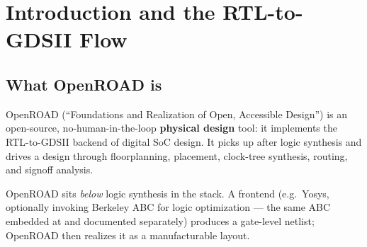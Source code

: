 \chapter{Introduction and the RTL-to-GDSII Flow}
\label{ch:intro}


\section{What OpenROAD is}

OpenROAD (``Foundations and Realization of Open, Accessible Design'') is an
open-source, no-human-in-the-loop \textbf{physical design} tool: it implements
the RTL-to-GDSII backend of digital SoC design. It picks up after logic
synthesis and drives a design through floorplanning, placement, clock-tree
synthesis, routing, and signoff analysis.

OpenROAD sits \emph{below} logic synthesis in the stack. A frontend (e.g.\
Yosys, optionally invoking Berkeley ABC for logic optimization --- the same ABC
embedded at \file{src/abc} and documented separately) produces a gate-level
netlist; OpenROAD then realizes it as a manufacturable layout.

